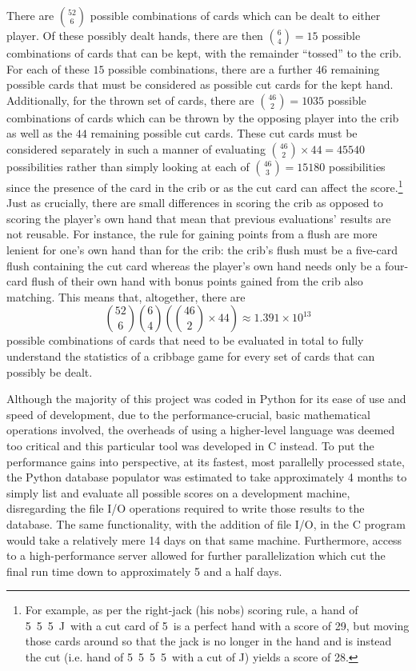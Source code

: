 There are ${52 \choose 6}$ possible combinations of cards which can be dealt to
either player.
%
Of these possibly dealt hands, there are then ${6 \choose 4} = 15$ possible
combinations of cards that can be kept,
with the remainder ``tossed'' to the crib.
%
For each of these $15$ possible combinations,
there are a further $46$ remaining possible cards
that must be considered as possible cut cards for the kept hand.
%
Additionally, for the thrown set of cards,
there are ${46 \choose 2} = 1035$ possible combinations of cards which can be
thrown by the opposing player into the crib as well as the
$44$ remaining possible cut cards.
%
These cut cards must be considered separately in such a manner of
evaluating ${46 \choose 2} \times 44 = 45540$ possibilities rather than
simply looking at each of ${46 \choose 3} = 15180$ possibilities
since the presence of the card in the crib or as the cut card
can affect the score.\footnote{
	For example, as per the right-jack (his nobs) scoring rule,
	a hand of 5\clubs\ 5\hearts\ 5\spades\ J\diamonds\ 
	with a cut card of 5\diamonds\ is a perfect hand
	with a score of 29,
	but moving those cards around so that the jack is no longer in the hand
	and is instead the cut
	(i.e. hand of 5\clubs\ 5\hearts\ 5\spades\ 5\diamonds\
	with a cut of J\diamonds)
	yields a score of 28.
}
%
Just as crucially, there are small differences in scoring the crib as opposed to
scoring the player's own hand that mean that previous evaluations' results are
not reusable.
%
For instance, the rule for gaining points from a flush are more lenient for
one's own hand than for the crib:
the crib's flush must be a five-card flush containing the cut card
whereas the player's own hand needs only be a four-card flush of their own
hand with bonus points gained from the crib also matching.
%
This means that, altogether, there are 
\[
	{52 \choose 6}
	{6 \choose 4}
	\left(
			{46 \choose 2} \times 44
	\right)
	\approx
	1.391 \times {10}^{13}
\]
possible combinations of cards that need to be evaluated in total to fully 
understand the statistics
of a cribbage game for every set of cards that can possibly be dealt.

Although the majority of this project was coded in Python for its ease of use
and speed of development,
due to the performance-crucial, basic mathematical operations involved,
the overheads of using a higher-level language was deemed too critical and
this particular tool was developed in C instead.
%
To put the performance gains into perspective,
at its fastest, most parallelly processed state,
the Python database populator was estimated to take approximately 4 months to
simply list and evaluate all possible scores on a development machine,
disregarding the file I/O operations required to write those results to the
database.
%
The same functionality, with the addition of file I/O,
in the C program would take a relatively mere 14 days
on that same machine.
%
Furthermore, access to a high-performance server allowed for further
parallelization which cut the final run time down to approximately 5 and a half
days.

